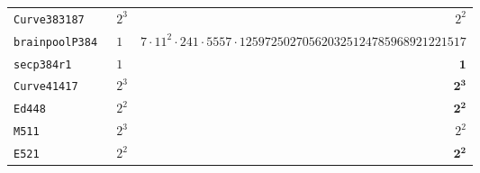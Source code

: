 \documentclass[11pt,fleqn]{article}
\begin{document}
\begin{tabularx}{\textwidth}{llR}
\texttt{\footnotesize Curve383187   }& $\scriptstyle 2^3$    & $\scriptstyle 2^2                                                                  $\\
\texttt{\footnotesize brainpoolP384 }& $\scriptstyle 1  $    & $\scriptstyle 7 \cdot 11^2 \cdot 241 \cdot 5557 \cdot 125972502705620325124785968921221517         $\\
\texttt{\footnotesize secp384r1     }& $\scriptstyle 1  $    & $\scriptstyle \mathbf{1}                                                                    $\\
\texttt{\footnotesize Curve41417    }& $\scriptstyle 2^3$    & $\scriptstyle \mathbf{2^3}                                                                  $\\
\texttt{\footnotesize Ed448         }& $\scriptstyle 2^2$    & $\scriptstyle \mathbf{2^2}                                                                  $\\
\texttt{\footnotesize M511          }& $\scriptstyle 2^3$    & $\scriptstyle 2^2                                                                  $\\
\texttt{\footnotesize E521          }& $\scriptstyle 2^2$    & $\scriptstyle \mathbf{2^2}$ \\
\hline
\end{tabularx}


\printbibliography
\end{document}
